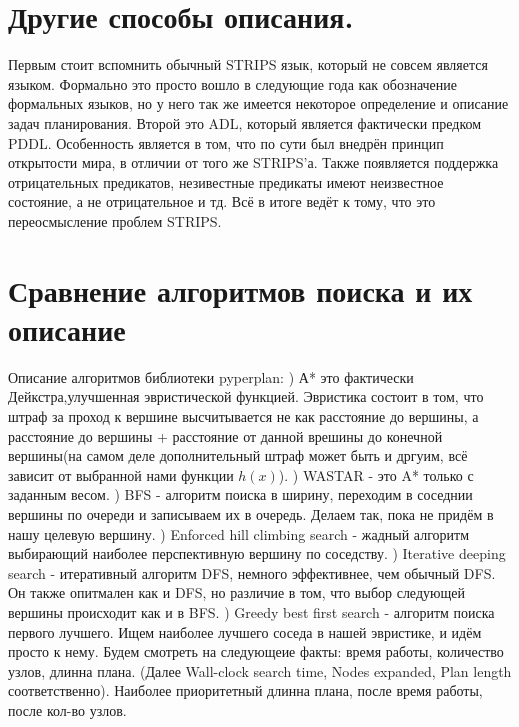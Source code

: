 \documentclass{article}
\begin{document}
\section*{Другие способы описания.}
Первым стоит вспомнить обычный STRIPS язык, который не совсем является языком. Формально это просто вошло в следующие года как обозначение формальных языков, но у него так же имеется некоторое определение и описание задач планирования. \newline
Второй это ADL, который является фактически предком PDDL. Особенность является в том, что по сути был внедрён принцип открытости  мира, в отличии от того же STRIPS'а. Также появляется поддержка отрицательных предикатов, незивестные предикаты имеют неизвестное состояние, а не отрицательное и тд. Всё в итоге ведёт к тому, что это переосмысление проблем STRIPS.

\section*{Сравнение алгоритмов поиска и их описание}
Описание алгоритмов библиотеки pyperplan: ) А* это фактически Дейкстра,улучшенная эвристической функцией. Эвристика состоит в том, что штраф за проход к вершине высчитывается не как расстояние до вершины, а расстояние до вершины + расстояние от данной врешины до конечной вершины(на самом деле дополнительный штраф может быть и дргуим, всё зависит от выбранной нами функции $h(x)$). ) WASTAR - это A* только с заданным весом. ) BFS - алгоритм поиска в ширину, переходим в соседнии вершины по очереди и записываем их в очередь. Делаем так, пока не придём в нашу целевую вершину. ) Enforced hill climbing search - жадный алгоритм выбирающий наиболее перспективную вершину по соседству. ) Iterative deeping search - итеративный алгоритм DFS, немного эффективнее, чем обычный DFS. Он также опитмален как и DFS, но различие в том, что выбор следующей вершины происходит как и в BFS. ) Greedy best first search - алгоритм поиска первого лучшего. Ищем наиболее лучшего соседа в нашей эвристике, и идём просто к нему. \newline
Будем смотреть на следующеие факты: время работы, количество узлов, длинна плана. (Далее Wall-clock search time, Nodes expanded, Plan length соответственно). Наиболее приоритетный длинна плана, после время работы, после кол-во узлов.
\end{document}
